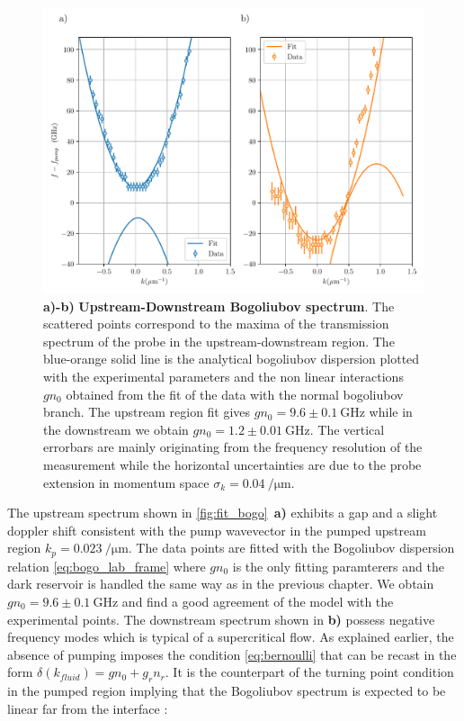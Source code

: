 \begin{figure}
    \centering
    \includegraphics[width=1\textwidth]{chap_stimulated_hawking/fig/fit_bogo.pdf}
    \caption{\textbf{a)-b)} \textbf{Upstream-Downstream Bogoliubov spectrum}. The scattered points correspond to the maxima of the transmission spectrum of the probe in the upstream-downstream region. The blue-orange solid 
    line is the analytical bogoliubov dispersion plotted with the experimental parameters and the non linear interactions $gn_0$ obtained from
    the fit of the data with the normal bogoliubov branch. The upstream region fit gives $gn_0 =9.6 \pm \SI{0.1}{\giga \hertz}$ while in the downstream we obtain $gn_0=1.2\pm \SI{0.01}{\giga \hertz}$.
    The vertical errorbars are mainly originating from the frequency resolution of the measurement while the horizontal uncertainties are due to the probe extension in momentum space $\sigma_k =\SI{0.04}{\per \micro \meter}$.}
    \label{fig:fit_bogo}
\end{figure}
\bigskip 

The upstream spectrum shown in \autoref{fig:fit_bogo}~\textbf{a)} exhibits a gap and a slight doppler shift consistent with the pump wavevector in the pumped upstream region $k_p=\SI{0.023}{\per \micro \meter}$. The data points are fitted with the Bogoliubov dispersion relation \ref{eq:bogo_lab_frame} where $gn_0$ is the only fitting paramterers and the dark reservoir
is handled the same way as in the previous chapter. 
We obtain $gn_0=9.6\pm\SI{0.1}{\giga \hertz}$ and find a good agreement of the model with the experimental points. The downstream spectrum shown in \textbf{b)} possess negative frequency modes which is typical of a supercritical flow.
As explained earlier, the absence of pumping imposes the condition \ref{eq:bernoulli} that can be recast in the form $\delta(k_{fluid})=gn_0+g_rn_r$. It is the counterpart of the turning point condition in the pumped region implying that the Bogoliubov spectrum is expected to be linear far from the interface :


